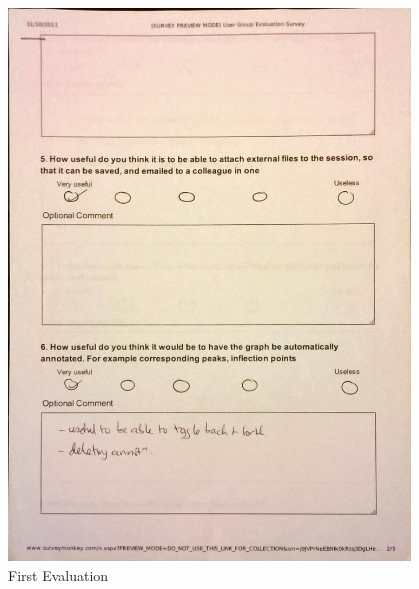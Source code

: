 \begin{figure}[h!]
    \centering
    \includegraphics[width=0.95\textwidth]{images/user_eval/user_eval_6.jpg}
    \caption{First Evaluation}
\end{figure}

